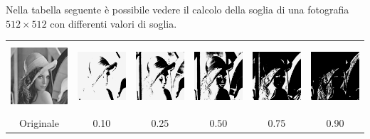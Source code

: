 \documentclass[a4paper,10pt]{article}
\begin{document}
Nella tabella seguente \`e possibile vedere il calcolo della soglia di una fotografia $512 \times 512$ con differenti valori di soglia.

\begin{center}
\begin{tabular}{c c c c c c}
\includegraphics[height=2.5cm]{lenna.png} &
\includegraphics[height=2.5cm]{lenna0_10.png} &
\includegraphics[height=2.5cm]{lenna0_25.png} &
\includegraphics[height=2.5cm]{lenna0_50.png} &
\includegraphics[height=2.5cm]{lenna0_75.png} &
\includegraphics[height=2.5cm]{lenna0_90.png} \\
Originale & 0.10 & 0.25 & 0.50 & 0.75 & 0.90 \\
\end{tabular}
\end{center}
\end{document}
